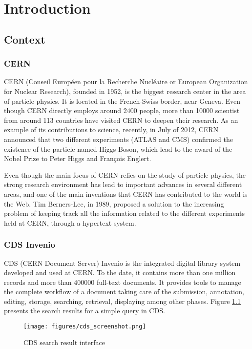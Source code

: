 \chapter{Introduction}


\section{Context}

\subsection{CERN}
CERN (Conseil Europ\'{e}en pour la Recherche Nucl\'{e}aire or European Organization for Nuclear Research)\cite{CERN}, founded in 1952, is the biggest research center in the area of particle physics. It is located in the French-Swiss border, near Geneva. Even though CERN directly employs around 2400 people, more than 10000 scientist from around 113 countries have visited CERN to deepen their research. As an example of its contributions to science, recently, in July of 2012, CERN announced that two different experiments (ATLAS and CMS) confirmed the existence of the particle named Higgs Boson, which lead to the award of the Nobel Prize to Peter Higgs and Fran\c{c}ois Englert.

Even though the main focus of CERN relies on the study of particle physics, the strong research environment has lead to important advances in several different areas, and one of the main inventions that CERN has contributed to the world is the Web. Tim Berners-Lee, in 1989, proposed a solution\cite{web_proposal} to the increasing problem of keeping track all the information related to the different experiments held at CERN, through a hypertext system. 

\subsection{CDS Invenio}
CDS\cite{CDS1} (CERN Document Server) Invenio is the integrated digital library system developed and used at CERN\cite{CDS2}. To the date, it contains more than one million records and more than 400000 full-text documents. It provides tools to manage the complete workflow of a document taking care of the submission, annotation, editing, storage, searching, retrieval, displaying among other phases. Figure \ref{cds_screenshot} presents the search results for a simple query in CDS.

\begin{figure}
\centering
\texttt{[image: figures/cds\_screenshot.png]}
\label{cds_screenshot}
\caption{CDS search result interface}
\end{figure}
 


